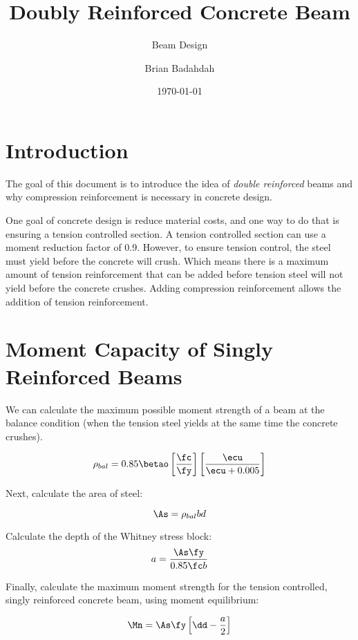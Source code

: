 \documentclass[landscape, twocolumn, 12pt]{article}
\title{Doubly Reinforced Concrete Beam}
\subtitle{Beam Design}
\author{Brian Badahdah}
\date{\today}
\begin{document}
\maketitle

\section{Introduction}
The goal of this document is to introduce the idea of \textit{double reinforced} beams and why compression reinforcement is necessary in concrete design.

One goal of concrete design is reduce material costs, and one way to do that is ensuring a tension controlled section. A tension controlled section can use a moment reduction factor of 0.9. However, to ensure tension control, the steel must yield before the concrete will crush. Which means there is a maximum amount of tension reinforcement that can be added before tension steel will not yield before the concrete crushes. Adding compression reinforcement allows the addition of tension reinforcement.

\section{Moment Capacity of Singly Reinforced Beams}
We can calculate the maximum possible moment strength of a beam at the balance condition (when the tension steel yields at the same time the concrete crushes).

\begin{equation}
  \rho_{bal} = 0.85\betao
  \left[\frac{\fc}{\fy}\right]
  \left[ \frac{\ecu}{\ecu+0.005}\right]
\end{equation}

Next, calculate the area of steel:

\begin{equation}
  \As = \rho_{bal} bd
\end{equation}

Calculate the depth of the Whitney stress block:
\begin{equation}
  a = \frac{\As\fy}{0.85 \fc b}
\end{equation}

Finally, calculate the maximum moment strength for the tension controlled, singly reinforced concrete beam, using moment equilibrium:

\begin{equation}
  \Mn = \As\fy \left[\dd-\frac{a}{2}\right]
\end{equation}
\end{document}
